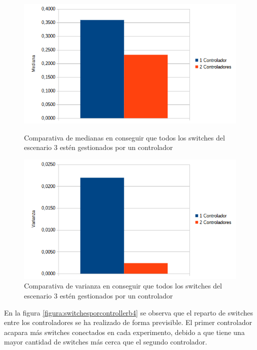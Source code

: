 \documentclass[a4paper, 12pt]{book}
\begin{document}
 	\begin{figure}[H]
	 	\centering
	 	\begin{minipage}[b]{0.45\textwidth}
	 		\centering
	 		\includegraphics[width=\textwidth]{img/comparativamedianaescenario3}
	 		\caption{Comparativa de medianas en conseguir que todos los switches del escenario 3 estén gestionados por un controlador}
	 		\label{fig:medianascenario3}
	 	\end{minipage}
	 	\hfill
	 	\begin{minipage}[b]{0.45\textwidth}
	 		\centering
	 		\includegraphics[width=\textwidth]{img/comparativavarianzaescenario3}
	 		\caption{Comparativa de varianza en conseguir que todos los switches del escenario 3 estén gestionados por un controlador}
	 		\label{fig:varianzaescenario3}
	 	\end{minipage}
 	\end{figure}
 	
 	En la figura \ref{figura:switchesporcontrollerb4} se observa que el reparto de switches entre los controladores se ha realizado de forma previsible. El primer controlador acapara más switches conectados en cada experimento, debido a que tiene una mayor cantidad de switches más cerca que el segundo controlador.
 	
\end{document}
